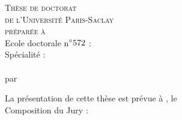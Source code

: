 \vspace*{1cm}
\color{blue!20!red!45!black} %
  \begin{center}    
    \LARGE\textsc{Thèse de doctorat\\ de l'Université Paris-Saclay} \\
    \LARGE{\textsc{préparée à \PhDworkingplace}} \\ \bigskip
  \color{black} %
	\bigskip  
    \Large{Ecole doctorale n$^{\circ}572$ :} %
     \Large{\ecodoctitle}  \\

     \Large{Spécialité : \PhDspeciality} \\%
    \vfill
    \LARGE{\textbf{\textsc{\PhDTitleFR}}} \\ %
    \bigskip
		\bigskip
		   \Large{par}\\
   \bigskip
	\bigskip
   \LARGE{\textbf{\textsc{\PhDname}}} %

    \vfill
    \bigskip
\end{center}
\color{black}
\begin{flushleft}
La présentation de cette thèse est prévue à , le  \\
\bigskip
Composition du Jury :
\bigskip
\end{flushleft}
%
